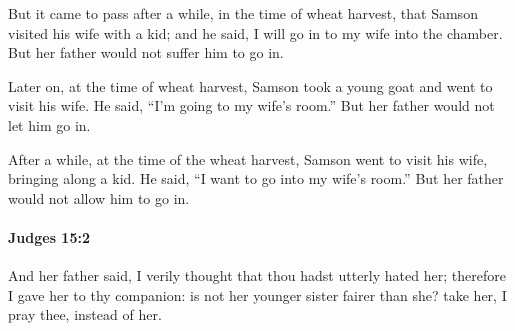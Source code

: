 			\begin{versebox}
					\item[BHS] 
					\item[ASV] But it came to pass after a while, in the time of wheat harvest, that Samson visited his wife with a kid; and he said, I will go in to my wife into the chamber. But her father would not suffer him to go in.
					\item[NIV] Later on, at the time of wheat harvest, Samson took a young goat and went to visit his wife. He said, “I’m going to my wife’s room.” But her father would not let him go in.
					\item[NRSV] After a while, at the time of the wheat harvest, Samson went to visit his wife, bringing along a kid. He said, “I want to go into my wife’s room.” But her father would not allow him to go in.
			\end{versebox}

		\paragraph{Judges 15:2} %
			\label{JUDGES-15-2}

			And her father said, I verily thought that thou hadst utterly hated her; therefore I gave her to thy companion: is not her younger sister fairer than she? take her, I pray thee, instead of her.

